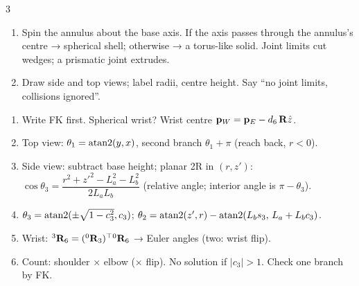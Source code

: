 \begin{multicols}{3}
\begin{recipe}
\begin{enumerate}
\item Spin the annulus about the base axis. If the axis passes through the annulus's centre → spherical shell; otherwise → a torus-like solid. Joint limits cut wedges; a prismatic joint extrudes.
\item Draw side and top views; label radii, centre height. Say ``no joint limits, collisions ignored''.
\end{enumerate}
\end{recipe}
\begin{recipe}\label{r:ik}
\begin{enumerate}
\item Write FK first. Spherical wrist? Wrist centre $\mathbf p_W=\mathbf p_E-d_6\,\mathbf R\hat z$.
\item Top view: $\theta_1=\operatorname{atan2}(y,x)$, second branch $\theta_1+\pi$ (reach back, $r<0$).
\item Side view: subtract base height; planar 2R in $(r,z')$:\\ $\cos\theta_3=\dfrac{r^2+z'^2-L_a^2-L_b^2}{2L_aL_b}$ (relative angle; interior angle is $\pi-\theta_3$).
\item $\theta_3=\operatorname{atan2}(\pm\sqrt{1-c_3^2},c_3)$; $\theta_2=\operatorname{atan2}(z',r)-\operatorname{atan2}(L_bs_3,\,L_a+L_bc_3)$.
\item Wrist: ${}^3\mathbf R_6=({}^0\mathbf R_3)^\top{}^0\mathbf R_6$ → Euler angles (two: wrist flip).
\item Count: shoulder × elbow (× flip). No solution if $|c_3|>1$. Check one branch by FK.
\end{enumerate}
\end{recipe}


\end{multicols}
